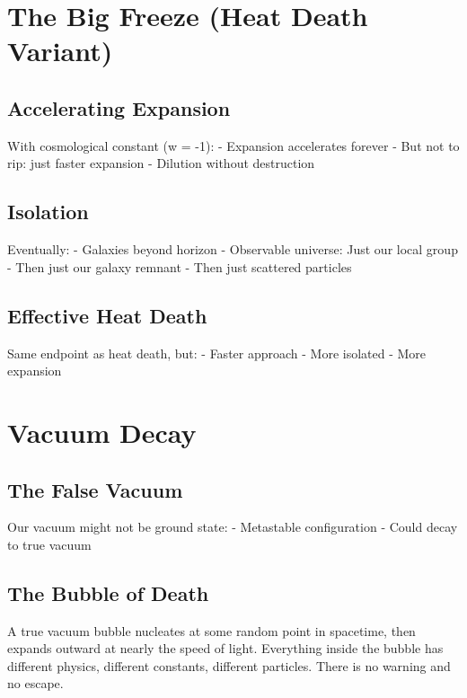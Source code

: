 \documentclass[
  11pt,
  letterpaper,
  twoside,
  openright]{book}
\begin{document}
\section{The Big Freeze (Heat Death
Variant)}\label{the-big-freeze-heat-death-variant}

\subsection{Accelerating Expansion}\label{accelerating-expansion}

With cosmological constant (w = -1): - Expansion accelerates forever -
But not to rip: just faster expansion - Dilution without destruction

\subsection{Isolation}\label{isolation}

Eventually: - Galaxies beyond horizon - Observable universe: Just our
local group - Then just our galaxy remnant - Then just scattered
particles

\subsection{Effective Heat Death}\label{effective-heat-death}

Same endpoint as heat death, but: - Faster approach - More isolated -
More expansion

\section{Vacuum Decay}\label{vacuum-decay}

\subsection{The False Vacuum}\label{the-false-vacuum}

Our vacuum might not be ground state: - Metastable configuration - Could
decay to true vacuum

\subsection{The Bubble of Death}\label{the-bubble-of-death}

A true vacuum bubble nucleates at some random point in spacetime, then
expands outward at nearly the speed of light. Everything inside the
bubble has different physics, different constants, different particles.
There is no warning and no escape.
\end{document}
